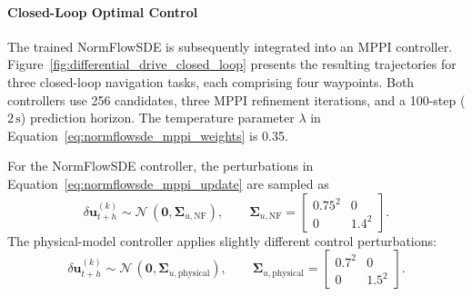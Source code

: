 \paragraph{Closed-Loop Optimal Control}
The trained NormFlowSDE is subsequently integrated into an MPPI controller. Figure~\ref{fig:differential_drive_closed_loop} presents the resulting trajectories for three closed-loop navigation tasks, each comprising four waypoints. Both controllers use 256 candidates, three MPPI refinement iterations, and a 100-step ($2\,\mathrm{s}$) prediction horizon. The temperature parameter $\lambda$ in Equation~\ref{eq:normflowsde_mppi_weights} is 0.35.

For the NormFlowSDE controller, the perturbations in Equation~\ref{eq:normflowsde_mppi_update} are sampled as
\begin{equation}
    \delta\boldsymbol{u}_{t+h}^{(k)}\sim
    \mathcal{N}\,\left(\boldsymbol{0},\boldsymbol{\Sigma}_{u,\mathrm{NF}}\right),
    \qquad
    \boldsymbol{\Sigma}_{u,\mathrm{NF}}=
    \begin{bmatrix}0.75^2&0\\0&1.4^2\end{bmatrix}.
\end{equation}
The physical-model controller applies slightly different control perturbations:
\begin{equation}
    \delta\boldsymbol{u}_{t+h}^{(k)}\sim
    \mathcal{N}\,\left(\boldsymbol{0},\boldsymbol{\Sigma}_{u,\mathrm{physical}}\right),
    \qquad
    \boldsymbol{\Sigma}_{u,\mathrm{physical}}=
    \begin{bmatrix}0.7^2&0\\0&1.5^2\end{bmatrix}.
\end{equation}

